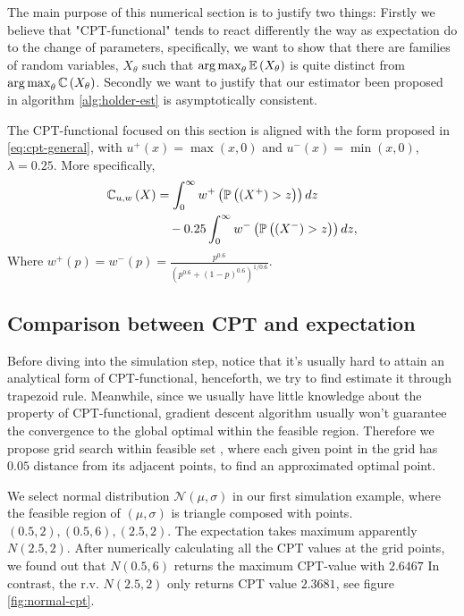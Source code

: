 The main purpose of this numerical section is to justify two things: Firstly we believe that "CPT-functional" tends to react differently the way as expectation do to the change of parameters, specifically, we want to show that there are families of random variables, $X_\theta$ such that $\mathop{\rm arg\,max}_{\theta} \mathbb{E}\left( X_\theta \right)$ is quite distinct from 
$\mathop{\rm arg\,max}_{\theta} \mathbb{C} \left( X_\theta \right)$. Secondly we want to justify that our estimator been proposed in algorithm 
\ref{alg:holder-est} is asymptotically consistent.

The CPT-functional focused on this section is aligned with the form proposed in \eqref{eq:cpt-general}, with $u^+(x) = \max(x,0)$ and 
$u^-(x) = \min(x,0)$, $\lambda = 0.25$. 
More specifically,
\begin{align}
\mathbb{C}_{u,w}\left(X\right) &= \int_0^{\infty} w^+\left(\mathbb{P}\left( (X^+)>z \right)\right) dz\nonumber \\
&\quad - 0.25 \int_0^{\infty} w^-\left(\mathbb{P}\left( (X^-)>z \right)\right) dz \label{eq:CPT-numerical-section} , 
\end{align}
Where $w^+(p) = w^-(p) = \frac{p^{0.6}}{(p^{0.6} + (1-p)^{0.6})^{1/0.6}}.$ 



\subsection{Comparison between CPT and expectation}
Before diving into the simulation step, notice that it's usually hard to attain an analytical form of CPT-functional, henceforth, we try to find estimate it through trapezoid rule. Meanwhile, since we usually have little knowledge about the property of CPT-functional, gradient descent algorithm usually won't guarantee the convergence to the global optimal within the feasible region. Therefore we propose grid search within feasible set , where each given point in the grid has $0.05$ distance from its adjacent points, to find an approximated optimal point.

We select normal distribution $\mathcal{N}(\mu, \sigma)$ in our first simulation example, where
the feasible region of $(\mu, \sigma)$ is triangle composed with points.
$(0.5,2), (0.5,6), (2.5,2)$. The expectation takes maximum apparently $N (2.5, 2)$. After numerically calculating all the CPT values at the grid points, we found out that  $N(0.5, 6)$ returns the maximum CPT-value with $2.6467$
In contrast, the r.v. $N (2.5, 2)$ only returns CPT value $2.3681$, see figure \ref{fig:normal-cpt}.

